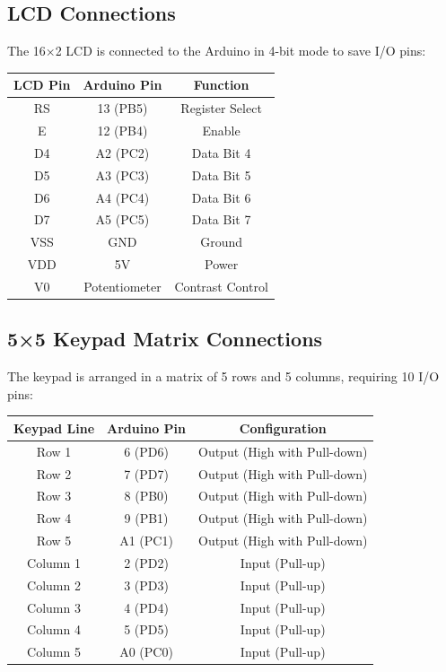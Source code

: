 \documentclass[12pt]{article}
\begin{document}
	\subsection{LCD Connections}
	The 16×2 LCD is connected to the Arduino in 4-bit mode to save I/O pins:
	
	\begin{center}
		\begin{tabular}{|c|c|c|}
			\hline
			\textbf{LCD Pin} & \textbf{Arduino Pin} & \textbf{Function} \\
			\hline
			RS & 13 (PB5) & Register Select \\
			E & 12 (PB4) & Enable \\
			D4 & A2 (PC2) & Data Bit 4 \\
			D5 & A3 (PC3) & Data Bit 5 \\
			D6 & A4 (PC4) & Data Bit 6 \\
			D7 & A5 (PC5) & Data Bit 7 \\
			VSS & GND & Ground \\
			VDD & 5V & Power \\
			V0 & Potentiometer & Contrast Control \\
			\hline
		\end{tabular}
	\end{center}
	
	\subsection{5×5 Keypad Matrix Connections}
	The keypad is arranged in a matrix of 5 rows and 5 columns, requiring 10 I/O pins:
	
	\begin{center}
		\begin{tabular}{|c|c|c|}
			\hline
			\textbf{Keypad Line} & \textbf{Arduino Pin} & \textbf{Configuration} \\
			\hline
			Row 1 & 6 (PD6) & Output (High with Pull-down) \\
			Row 2 & 7 (PD7) & Output (High with Pull-down) \\
			Row 3 & 8 (PB0) & Output (High with Pull-down) \\
			Row 4 & 9 (PB1) & Output (High with Pull-down) \\
			Row 5 & A1 (PC1) & Output (High with Pull-down) \\
			\hline
			Column 1 & 2 (PD2) & Input (Pull-up) \\
			Column 2 & 3 (PD3) & Input (Pull-up) \\
			Column 3 & 4 (PD4) & Input (Pull-up) \\
			Column 4 & 5 (PD5) & Input (Pull-up) \\
			Column 5 & A0 (PC0) & Input (Pull-up) \\
			\hline
		\end{tabular}
	\end{center}
	
\end{document}
